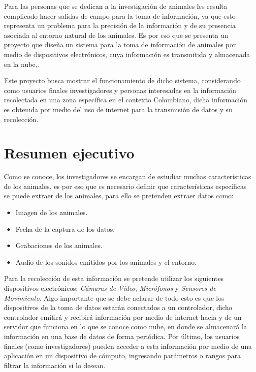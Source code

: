 
Para las personas que se dedican a la investigación de animales les resulta complicado hacer salidas de campo para la toma de información, ya que esto representa un problema para la precisión de la información y de su presencia asociada al entorno natural de los animales. Es por eso que se presenta un proyecto que diseña un sistema para la toma de información de animales por medio de dispositivos electrónicos, cuya información es transmitida y almacenada en la nube,.

Este proyecto busca mostrar el funcionamiento de dicho sistema, considerando como usuarios finales investigadores y personas interesadas en la información recolectada en una zona específica en el contexto Colombiano, dicha información es obtenida por medio del uso de internet para la transmisión de datos y su recolección.

\section{Resumen ejecutivo}

Como se conoce, los investigadores se encargan de estudiar muchas características de los animales, es por eso que es necesario definir que características específicas se puede extraer de los animales, para ello se pretenden extraer datos como:

\begin{itemize}
    \item Imagen de los animales.
    \item Fecha de la captura de los datos.
    \item Grabaciones de los animales.
    \item Audio de los sonidos emitidos por los animales y el entorno.
\end{itemize}

Para la recolección de esta información se pretende utilizar los siguientes dispositivos electrónicos: \emph{Cámaras de Vídeo}, \emph{Micrófonos} y \emph{Sensores de Movimiento}. Algo importante que se debe aclarar de todo esto es que los dispositivos de la toma de datos estarán conectados a un controlador, dicho controlador emitirá y recibirá información por medio de internet hacia y de un servidor que funciona en lo que se conoce como nube, en donde se almacenará la información en una base de datos de forma periódica. Por último, los usuarios finales (como investigadores) pueden acceder a esta información por medio de una aplicación en un dispositivo de cómputo, ingresando parámetros o rangos para filtrar la información si lo desean.

